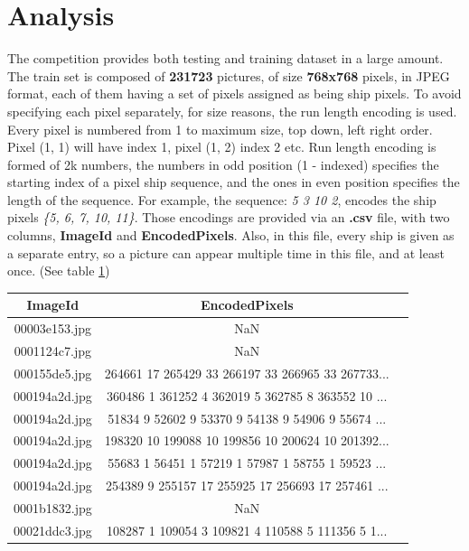 \section{Analysis}
The competition provides both testing and training dataset in a large amount. The train set is composed of \textbf{231723} pictures, of size \textbf{768x768} pixels, in JPEG format, each of them having a set of pixels assigned as being ship pixels. To avoid specifying each pixel separately, for size reasons, the run length encoding is used. Every pixel is numbered from 1 to maximum size, top down, left right order. Pixel (1, 1) will have index 1, pixel (1, 2) index 2 etc. Run length encoding is formed of 2k numbers, the numbers in odd position (1 - indexed) specifies the starting index of a pixel ship sequence, and the ones in even position specifies the length of the sequence.
For example, the sequence: \textit{5 3 10 2}, encodes the ship pixels \textit{\{5, 6, 7, 10, 11\}}. Those encodings are provided via an \textbf{.csv} file, with two columns, \textbf{ImageId} and \textbf{EncodedPixels}. Also, in this file, every ship is given as a separate entry, so a picture can appear multiple time in this file, and at least once. (See table \ref{traindfhead})\\

\begin{table}[H]
	\centering
	\begin{tabular}{|c|c|l|}
		\hline
		ImageId & EncodedPixels \\ \hline
		00003e153.jpg & NaN         \\ \hline
		0001124c7.jpg & NaN         \\ \hline
		000155de5.jpg & 264661 17 265429 33 266197 33 266965 33 267733...         \\ \hline
		000194a2d.jpg & 360486 1 361252 4 362019 5 362785 8 363552 10 ...   \\ \hline
		000194a2d.jpg & 51834 9 52602 9 53370 9 54138 9 54906 9 55674 ...   \\ \hline
		000194a2d.jpg & 198320 10 199088 10 199856 10 200624 10 201392...  \\ \hline
		000194a2d.jpg & 55683 1 56451 1 57219 1 57987 1 58755 1 59523 ...  \\ \hline
		000194a2d.jpg & 254389 9 255157 17 255925 17 256693 17 257461 ...  \\ \hline
		0001b1832.jpg & NaN  \\ \hline
		00021ddc3.jpg & 108287 1 109054 3 109821 4 110588 5 111356 5 1...  \\ \hline
	\end{tabular}
	\label{traindfhead}
\end{table}

